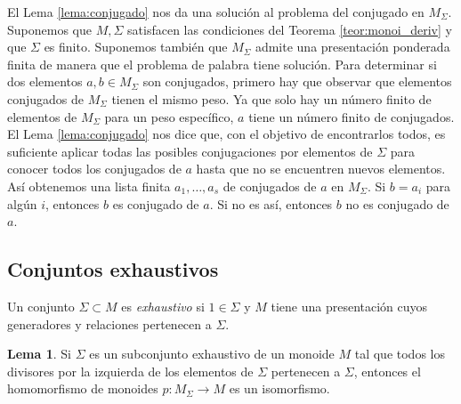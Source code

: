 \documentclass[12pt]{book}
\theoremstyle{definition}
\newtheorem{lema}{Lema}[section]
\begin{document}
El Lema \ref{lema:conjugado} nos da una solución al problema del conjugado en $M_\Sigma$. Suponemos que $M,\Sigma$ satisfacen las condiciones del Teorema \ref{teor:monoi_deriv} y que $\Sigma$ es finito. Suponemos también que $M_\Sigma$ admite una presentación ponderada finita de manera que el problema de palabra tiene solución. Para determinar si dos elementos $a,b\in M_\Sigma$ son conjugados, primero hay que observar que elementos conjugados de $M_\Sigma$ tienen el mismo peso. Ya que solo hay un número finito de elementos de $M_\Sigma$ para un peso específico, $a$ tiene un número finito de conjugados. El Lema \ref{lema:conjugado} nos dice que, con el objetivo de encontrarlos todos, es suficiente aplicar todas las posibles conjugaciones por elementos de $\Sigma$ para conocer todos los conjugados de $a$ hasta que no se encuentren nuevos elementos. Así obtenemos una lista finita $a_1,\ldots,a_s$ de conjugados de $a$ en $M_\Sigma$. Si $b=a_i$ para algún $i$, entonces $b$ es conjugado de $a$. Si no es así, entonces $b$ no es conjugado de $a$.

\subsection{Conjuntos exhaustivos}

Un conjunto $\Sigma\subset M$ es \textit{exhaustivo} si $1\in\Sigma$ y $M$ tiene una presentación cuyos generadores y relaciones pertenecen a $\Sigma$.

\begin{lema}
Si $\Sigma$ es un subconjunto exhaustivo de un monoide $M$ tal que todos los divisores por la izquierda de los elementos de $\Sigma$ pertenecen a $\Sigma$, entonces el homomorfismo de monoides $p:M_\Sigma\rightarrow M$ es un isomorfismo.
\label{lema:iso_mono}
\end{lema}
\end{document}
